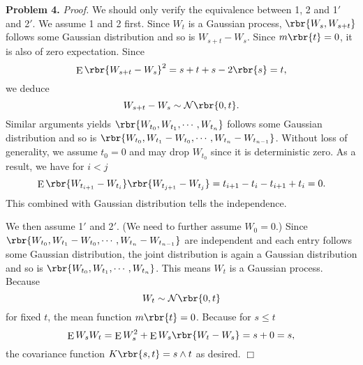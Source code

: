 \documentclass[english, nochinese]{pnote}
\DeclareMathOperator\ope{\mathrm{E}}
\begin{document}
\textbf{Problem 4.} \textit{Proof.} We should only verify the equivalence between 1, 2 and 1$'$ and 2$'$. We assume 1 and 2 first. Since $W_t$ is a Gaussian process, $ \rbr{ W_s, W_{ s + t } } $ follows some Gaussian distribution and so is $ W_{ s + t } - W_s $. Since $ m \rbr{t} = 0 $, it is also of zero expectation. Since
\begin{equation}
\ope \rbr{ W_{ s + t } - W_s }^2 = s + t + s - 2 \rbr{s} = t,
\end{equation}
we deduce
\begin{equation}
W_{ s + t } - W_s \sim \mathcal{N} \rbr{ 0, t }.
\end{equation}
Similar arguments yields $ \rbr{ W_{t_0}, W_{t_1}, \cdots, W_{t_n} } $ follows some Gaussian distribution and so is $ \rbr{ W_{t_0}, W_{t_1} - W_{t_0}, \cdots, W_{t_n} - W_{t_{ n - 1 }} } $. Without loss of generality, we assume $ t_0 = 0 $ and may drop $W_{t_0}$ since it is deterministic zero. As a result, we have for $ i < j $
\begin{equation}
\ope \rbr{ W_{t_{ i + 1 }} - W_{t_i} } \rbr{ W_{t_{ j + 1 }} - W_{t_j} } = t_{ i + 1 } - t_i - t_{ i + 1 } + t_i = 0.
\end{equation}
This combined with Gaussian distribution tells the independence.

We then assume 1$'$ and 2$'$. (We need to further assume $ W_0 = 0 $.) Since $ \rbr{ W_{t_0}, W_{t_1} - W_{t_0}, \cdots, W_{t_n} - W_{t_{ n - 1 }} } $ are independent and each entry follows some Gaussian distribution, the joint distribution is again a Gaussian distribution and so is $ \rbr{ W_{t_0}, W_{t_1}, \cdots, W_{t_n} } $. This means $W_t$ is a Gaussian process. Because
\begin{equation}
W_t \sim \mathcal{N} \rbr{ 0, t }
\end{equation}
for fixed $t$, the mean function $ m \rbr{t} = 0 $. Because for $ s \le t $
\begin{equation}
\ope W_s W_t = \ope W_s^2 + \ope W_s \rbr{ W_t - W_s } = s + 0 = s,
\end{equation}
the covariance function $ K \rbr{ s, t } = s \wedge t $ as desired.
\hfill$\Box$
\end{document}
